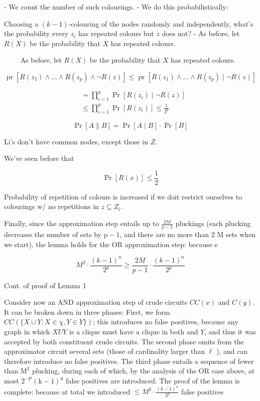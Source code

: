 - We count the number of such colourings.
- We do this probabilistically:

Choosing a $(k-1)$-colouring of the nodes randomly and independently, what's the probability every $z_i$ has repeated colours but $z$ does not?
- As before, let $R(X)$ be the probability that $X$ has repeated colours.


$\qquad$ As before, let $R(X)$ be the probability that $X$ has repeated colours.

$$
\operatorname{pr}\left[R\left(z_1\right) \wedge \ldots \wedge R\left(z_p\right) \wedge \neg R(z)\right] \leqslant \operatorname{pr}\left[R\left(z_1\right) \wedge \ldots \wedge R\left(z_p\right) \mid \neg R(z)\right]$$

$$
\begin{aligned}
& =\prod_{i=1}^p \operatorname{Pr}\left[R\left(z_i\right) \mid \neg R(z)\right] \\
& \leqslant \prod_{i=1}^p \operatorname{Pr}\left[R\left(z_i\right)\right]
\leqslant \frac{1}{2^p}
\end{aligned}
$$

$$
\operatorname{Pr}[A \| B]=\operatorname{Pr}[A \mid B] \cdot \operatorname{Pr}[B]
$$


Li's don't have common nodes, except those in $Z$.

We've seen before that

$$
\operatorname{Pr}[R(x)] \leqslant \frac{1}{2}
$$

Probability of repetition of colours is increased if we doit restrict ourselves to colourings w/ no repetitions in $z \subseteq Z_i$.


Finally, since the approximation step entails up to $\frac{2 M}{p-1}$ pluckings (each plucking decreases the number of sets by $\mathrm{p}-1$, and there are no more than 2 M sets when we start), the lemma holds for the OR approximation step: because e

$$
M^2 \cdot \frac{(k-1)^n}{2^p} \geqslant \frac{2 M}{p-1} \cdot \frac{(k-1)^n}{2^p}
$$


Cont. of proof of Lemma 1

Consider now an AND approximation step of crude circuits $C C(x)$ and $C(y)$. It can be broken down in three phases: First, we form $C C(\{X \cup Y: X \in \chi, Y \in Y\})$; this introduces no false positives, because any graph in which $X U Y$ is a clique must have a clique in both and $Y$, and thus it was accepted by both constituent crude circuits. The second phase omits from the approximator circuit several sets (those of cardinality larger than $\ell$ ), and can therefore introduce no false positives. The third phase entails a sequence of fewer than $\mathrm{M}^2$ plucking, during each of which, by the analysis of the OR case above, at most $2^{-\mathrm{P}}(\mathrm{k}-1)^{\mathrm{n}}$ false positives are introduced. The proof of the lemma is complete: because at total we introduced $\leq M^2 \cdot \frac{(k-1)^n}{2^p}$ false positives




